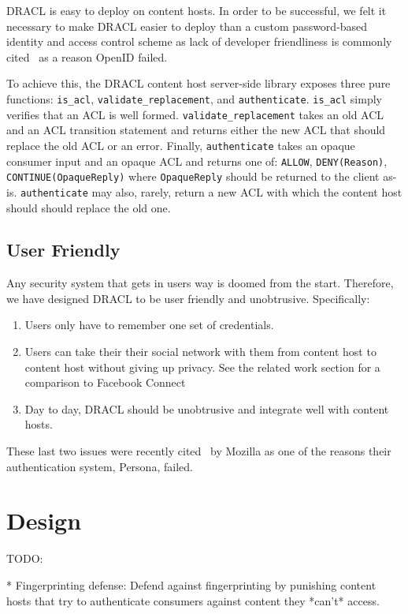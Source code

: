 \documentclass[pdftex,12pt,a4papaer]{report}
\begin{document}
\begin{compactenum}
DRACL is easy to deploy on content hosts. In order to be successful, we felt it
necessary to make DRACL easier to deploy than a custom password-based identity
and access control scheme as lack of developer friendliness is commonly
cited~\cite{todo} as a reason OpenID failed.

To achieve this, the DRACL content host server-side library exposes three pure
functions: \verb=is_acl=, \verb=validate_replacement=, and \verb=authenticate=.
\verb=is_acl= simply verifies that an ACL is well formed.
\verb=validate_replacement= takes an old ACL and an ACL transition statement and
returns either the new ACL that should replace the old ACL or an error. Finally,
\verb=authenticate= takes an opaque consumer input and an opaque ACL and returns
one of: \verb=ALLOW=, \verb=DENY(Reason)=, \verb=CONTINUE(OpaqueReply)= where
\verb=OpaqueReply= should be returned to the client as-is. \verb=authenticate=
may also, rarely, return a new ACL with which the content host should should
replace the old one.

\section{User Friendly}

Any security system that gets in users way is doomed from the start. Therefore,
we have designed DRACL to be user friendly and unobtrusive. Specifically:

\begin{enumerate}
  \item Users only have to remember one set of credentials.
  \item Users can take their their social network with them from content host to
    content host without giving up privacy. See the related work section for a
    comparison to Facebook Connect\texttrademark~\cite{todo}
  \item Day to day, DRACL should be unobtrusive and integrate well with content
    hosts.
\end{enumerate}

These last two issues were recently cited~\cite{todo} by Mozilla as one of the
reasons their authentication system, Persona, failed.
\chapter{Design}

TODO:

* Fingerprinting defense: Defend against fingerprinting by punishing content
hosts that try to authenticate consumers against content they *can't* access.


\end{compactenum}
\end{document}

